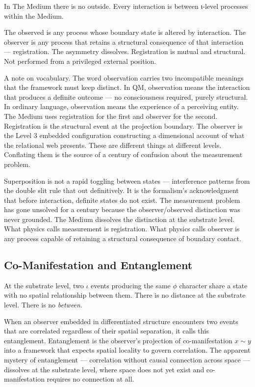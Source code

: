 \documentclass[11pt,letterpaper]{article}
\begin{document}
In The Medium there is no outside. Every interaction is between ι-level processes within the Medium.

The observed is any process whose boundary state is altered by interaction. The observer is any process that retains a structural consequence of that interaction — registration. The asymmetry dissolves. Registration is mutual and structural. Not performed from a privileged external position.

A note on vocabulary. The word observation carries two incompatible meanings that the framework must keep distinct. In QM, observation means the interaction that produces a definite outcome — no consciousness required, purely structural. In ordinary language, observation means the experience of a perceiving entity. The Medium uses registration for the first and observer for the second. Registration is the structural event at the projection boundary. The observer is the Level 3 embedded configuration constructing a dimensional account of what the relational web presents. These are different things at different levels. Conflating them is the source of a century of confusion about the measurement problem.

Superposition is not a rapid toggling between states — interference patterns from the double slit rule that out definitively. It is the formalism's acknowledgment that before interaction, definite states do not exist. The measurement problem has gone unsolved for a century because the observer/observed distinction was never grounded. The Medium dissolves the distinction at the substrate level. What physics calls measurement is registration. What physics calls observer is any process capable of retaining a structural consequence of boundary contact.

\subsection{Co-Manifestation and Entanglement}
\label{sec:org47bec4b}

At the substrate level, two \(\iota\) events producing the same \(\phi\) character share a state with no spatial relationship between them. There is no distance at the substrate level. There is no \emph{between}.

When an observer embedded in differentiated structure encounters two events that are correlated regardless of their spatial separation, it calls this entanglement. Entanglement is the observer's projection of co-manifestation \(x \sim y\) into a framework that expects spatial locality to govern correlation. The apparent mystery of entanglement --- correlation without causal connection across space --- dissolves at the substrate level, where space does not yet exist and co-manifestation requires no connection at all.
\end{document}
